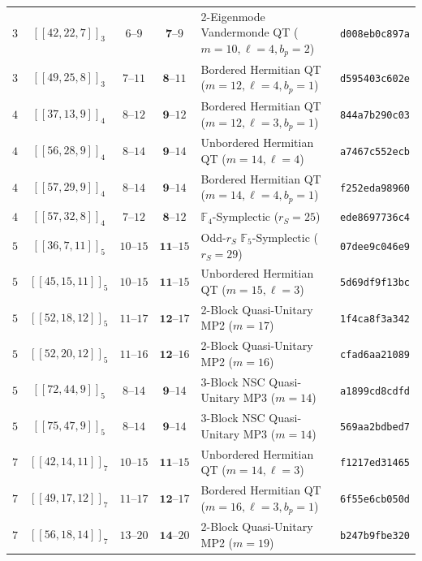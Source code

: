 \documentclass[11pt,a4paper]{article}
\theoremstyle{remark}
\begin{document}
\begin{table}[htbp]
{\begin{tabular}{@{}ccccll@{}}
$3$ & $[[42,22,7]]_{3}$ & $6\text{--}9$ & $\mathbf{7}\text{--}9$ & 2-Eigenmode Vandermonde QT ($m=10, \ell=4, b_p=2$) & \texttt{d008eb0c897a} \\
$3$ & $[[49,25,8]]_{3}$ & $7\text{--}11$ & $\mathbf{8}\text{--}11$ & Bordered Hermitian QT ($m=12, \ell=4, b_p=1$) & \texttt{d595403c602e} \\
\midrule
$4$ & $[[37,13,9]]_{4}$ & $8\text{--}12$ & $\mathbf{9}\text{--}12$ & Bordered Hermitian QT ($m=12, \ell=3, b_p=1$) & \texttt{844a7b290c03} \\
$4$ & $[[56,28,9]]_{4}$ & $8\text{--}14$ & $\mathbf{9}\text{--}14$ & Unbordered Hermitian QT ($m=14, \ell=4$) & \texttt{a7467c552ecb} \\
$4$ & $[[57,29,9]]_{4}$ & $8\text{--}14$ & $\mathbf{9}\text{--}14$ & Bordered Hermitian QT ($m=14, \ell=4, b_p=1$) & \texttt{f252eda98960} \\
$4$ & $[[57,32,8]]_{4}$ & $7\text{--}12$ & $\mathbf{8}\text{--}12$ & $\mathbb{F}_4$-Symplectic ($r_S=25$) & \texttt{ede8697736c4} \\
\midrule
$5$ & $[[36,7,11]]_{5}$ & $10\text{--}15$ & $\mathbf{11}\text{--}15$ & Odd-$r_S$ $\mathbb{F}_{5}$-Symplectic ($r_S=29$) & \texttt{07dee9c046e9} \\
$5$ & $[[45,15,11]]_{5}$ & $10\text{--}15$ & $\mathbf{11}\text{--}15$ & Unbordered Hermitian QT ($m=15, \ell=3$) & \texttt{5d69df9f13bc} \\
$5$ & $[[52,18,12]]_{5}$ & $11\text{--}17$ & $\mathbf{12}\text{--}17$ & 2-Block Quasi-Unitary MP2 ($m=17$) & \texttt{1f4ca8f3a342} \\
$5$ & $[[52,20,12]]_{5}$ & $11\text{--}16$ & $\mathbf{12}\text{--}16$ & 2-Block Quasi-Unitary MP2 ($m=16$) & \texttt{cfad6aa21089} \\
$5$ & $[[72,44,9]]_{5}$ & $8\text{--}14$ & $\mathbf{9}\text{--}14$ & 3-Block NSC Quasi-Unitary MP3 ($m=14$) & \texttt{a1899cd8cdfd} \\
$5$ & $[[75,47,9]]_{5}$ & $8\text{--}14$ & $\mathbf{9}\text{--}14$ & 3-Block NSC Quasi-Unitary MP3 ($m=14$) & \texttt{569aa2bdbed7} \\
\midrule
$7$ & $[[42,14,11]]_{7}$ & $10\text{--}15$ & $\mathbf{11}\text{--}15$ & Unbordered Hermitian QT ($m=14, \ell=3$) & \texttt{f1217ed31465} \\
$7$ & $[[49,17,12]]_{7}$ & $11\text{--}17$ & $\mathbf{12}\text{--}17$ & Bordered Hermitian QT ($m=16, \ell=3, b_p=1$) & \texttt{6f55e6cb050d} \\
$7$ & $[[56,18,14]]_{7}$ & $13\text{--}20$ & $\mathbf{14}\text{--}20$ & 2-Block Quasi-Unitary MP2 ($m=19$) & \texttt{b247b9fbe320} \\

\end{tabular}}
\end{table}
\end{document}
